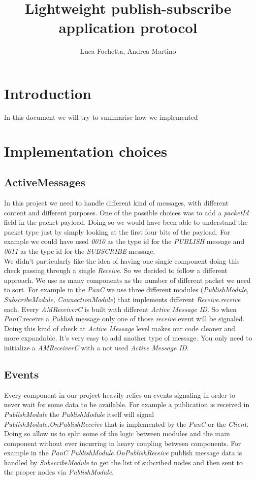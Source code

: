 \documentclass[10pt]{article}
\begin{document}
\title{Lightweight publish-subscribe application protocol}
\author{Luca Fochetta, Andrea Martino}

\maketitle


\section{Introduction}
In this document we will try to summarise how we implemented
\section{Implementation choices}

\subsection{ActiveMessages}
In this project we need to handle different kind of messages, with different content and different purposes. One of the possible choices was to add a \emph{packetId} field in the packet payload. Doing so we would have been able to understand the packet type just by simply looking at the first four bits of the payload. For example we could have used \emph{0010} as the type id for the \emph{PUBLISH} message and \emph{0011} as the type id for the \emph{SUBSCRIBE} message.\\We didn't particularly like the idea of having one single component doing this check passing through a single \emph{Receive}. So we decided to follow a different approach. We use as many components as the number of different packet we need to sort. For example in the \emph{PanC} we use three different modules (\emph{PublishModule}, \emph{SubscribeModule}, \emph{ConnectionModule}) that implements different \emph{Receive.receive} each. Every \emph{AMReceiverC} is built with different \emph{Active Message ID}. So when \emph{PanC} receive a \emph{Publish} message only one of those \emph{receive} event will be signaled.\\Doing this kind of check at \emph{Active Message} level makes our code cleaner and more expandable. It's very easy to add another type of message. You only need to initialize a \emph{AMReceiverC} with a not used \emph{Active Message ID}.

\subsection{Events}
Every component in our project heavily relies on events signaling in order to never wait for some data to be available. For example a publication is received in \emph{PublishModule} the \emph{PublishModule} itself will signal \emph{PublishModule.OnPublishReceive} that is implemented by the \emph{PanC} or the \emph{Client}. Doing so allow us to split some of the logic between modules and the main component without ever incurring in heavy coupling between components. For example in the \emph{PanC PublishModule.OnPublishReceive} publish message data is handled by \emph{SubscribeModule} to get the list of subcribed nodes and then sent to the proper nodes via \emph{PublishModule}.
\end{document}
